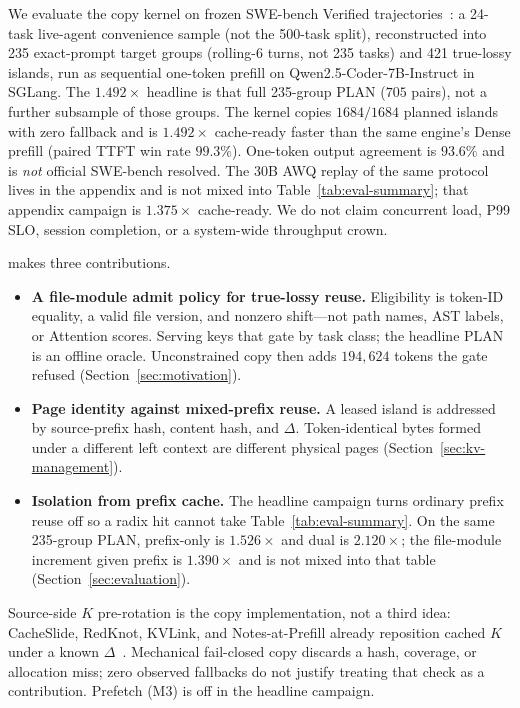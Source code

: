 We evaluate the copy kernel on frozen SWE-bench Verified
trajectories~\cite{swebench}: a 24-task live-agent convenience sample
(not the 500-task split), reconstructed into 235 exact-prompt target
groups (rolling-6 turns, not 235 tasks) and 421 true-lossy islands, run
as sequential one-token prefill on Qwen2.5-Coder-7B-Instruct
in SGLang. The $1.492\times$ headline is that full 235-group PLAN
($705$ pairs), not a further subsample of those groups. The kernel copies $1684/1684$ planned islands with zero
fallback and is $1.492\times$ cache-ready faster than the same engine's
Dense prefill (paired TTFT win rate $99.3\%$). One-token output agreement
is $93.6\%$ and is \emph{not} official SWE-bench resolved. The 30B AWQ
replay of the same protocol lives in the appendix and is not mixed
into Table~\ref{tab:eval-summary}; that appendix campaign is
$1.375\times$ cache-ready.
We do not claim concurrent load, P99 SLO, session completion, or a
system-wide throughput crown.

\method{} makes three contributions.

\begin{itemize}[leftmargin=1.2em,itemsep=0.25em]
    \item \textbf{A file-module admit policy for true-lossy reuse.}
          Eligibility is token-ID equality, a valid file version, and
          nonzero shift---not path names, AST labels, or Attention
          scores. Serving keys that gate by task class; the headline
          PLAN is an offline oracle. Unconstrained copy then adds
          $194{,}624$ tokens the gate refused
          (Section~\ref{sec:motivation}).
    \item \textbf{Page identity against mixed-prefix reuse.}
          A leased island is addressed by source-prefix hash, content
          hash, and $\Delta$. Token-identical bytes formed under a
          different left context are different physical pages
          (Section~\ref{sec:kv-management}).
    \item \textbf{Isolation from prefix cache.}
          The headline campaign turns ordinary prefix reuse off so a
          radix hit cannot take Table~\ref{tab:eval-summary}. On the
          same 235-group PLAN, prefix-only is $1.526\times$ and dual is
          $2.120\times$; the file-module increment given prefix is
          $1.390\times$ and is not mixed into that table
          (Section~\ref{sec:evaluation}).
\end{itemize}

Source-side $K$ pre-rotation is the copy implementation, not a third
idea: CacheSlide, RedKnot, KVLink, and Notes-at-Prefill already
reposition cached $K$ under a known
$\Delta$~\cite{liu2026cacheslide,liu2026redknot,yang2025kvlink,li2026notes}.
Mechanical fail-closed copy discards a hash, coverage, or allocation
miss; zero observed fallbacks do not justify treating that check as a
contribution. Prefetch (M3) is off in the headline campaign.

